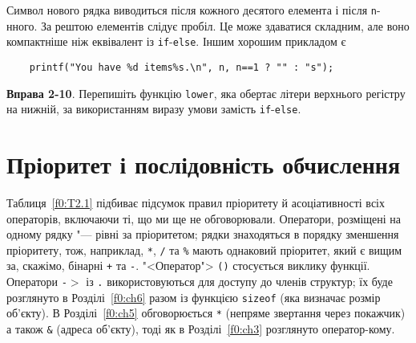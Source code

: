 \documentclass[a4paper,12pt]{book}
\begin{document}
  Символ нового рядка виводиться після кожного десятого елемента і після \texttt{n}-нного.
  За рештою елементів слідує пробіл. Це може здаватися складним, але воно компактніше ніж
  еквівалент із \texttt{if}-\texttt{else}. Іншим хорошим прикладом є
  \begin{verbatim}
    printf("You have %d items%s.\n", n, n==1 ? "" : "s");
  \end{verbatim}

  \textbf{Вправа 2-10}. Перепишіть функцію \texttt{lower}, яка обертає літери верхнього
  регістру на нижній, за використанням виразу умови замість \texttt{if}-\texttt{else}.

\section{Пріоритет і послідовність обчислення}


  Таблиця~\ref{f0:T2.1} підбиває підсумок правил пріоритету й асоціативності
  всіх операторів, включаючи ті, що ми ще не обговорювали. Оператори, розміщені на одному
  рядку "--- рівні за пріоритетом; рядки знаходяться в порядку зменшення пріоритету,
  тож, наприклад, \texttt{*}, \texttt{/} та \texttt{\%} мають однаковий пріоритет, який є
  вищим за, скажімо, бінарні \texttt{+} та \texttt{-}. "<Оператор"> \texttt{()}
  стосується виклику функції. Оператори \texttt{-\mbox{$>$}} із \texttt{.} використовуються для
  доступу до членів структур; їх буде розглянуто в Розділі~\ref{f0:ch6} разом із
  функцією \texttt{sizeof} (яка визначає розмір об'єкту). В Розділі~\ref{f0:ch5}
  обговорюється \texttt{*} (непряме звертання через покажчик) а також \texttt{\&}
  (адреса об'єкту), тоді як в Розділі~\ref{f0:ch3} розглянуто оператор-кому.
\end{document}
